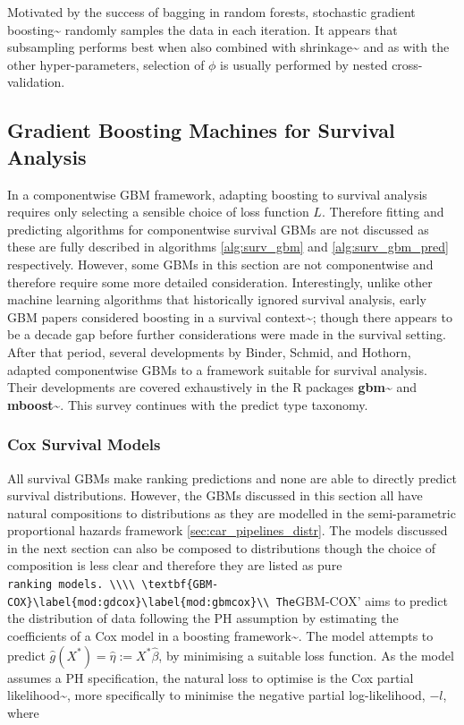 \documentclass[
  letterpaper,
]{scrbook}
\theoremstyle{plain}
\theoremstyle{definition}
\theoremstyle{remark}
\begin{document}
Motivated by the success of bagging in random forests, stochastic
gradient boosting\textasciitilde{}\cite{Friedman1999} randomly samples
the data in each iteration. It appears that subsampling performs best
when also combined with shrinkage\textasciitilde{}\cite{Hastie2001} and
as with the other hyper-parameters, selection of \(\phi\) is usually
performed by nested cross-validation.

\subsection{Gradient Boosting Machines for Survival Analysis}
\label{sec:surv_ml_models_boost_surv}

In a componentwise GBM framework, adapting boosting to survival analysis
requires only selecting a sensible choice of loss function \(L\).
Therefore fitting and predicting algorithms for componentwise survival
GBMs are not discussed as these are fully described in algorithms
\ref{alg:surv_gbm} and \ref{alg:surv_gbm_pred} respectively. However,
some GBMs in this section are not componentwise and therefore require
some more detailed consideration. Interestingly, unlike other machine
learning algorithms that historically ignored survival analysis, early
GBM papers considered boosting in a survival
context\textasciitilde{}\cite{Ridgeway1999}; though there appears to be
a decade gap before further considerations were made in the survival
setting. After that period, several developments by Binder, Schmid, and
Hothorn, adapted componentwise GBMs to a framework suitable for survival
analysis. Their developments are covered exhaustively in the R packages
\textbf{gbm}\textasciitilde{}\cite{pkggbm} and
\textbf{mboost}\textasciitilde{}\cite{pkgmboost}. This survey continues
with the predict type taxonomy.

\subsubsection{Cox Survival Models}

All survival GBMs make ranking predictions and none are able to directly
predict survival distributions. However, the GBMs discussed in this
section all have natural compositions to distributions as they are
modelled in the semi-parametric proportional hazards framework
\ref{sec:car_pipelines_distr}. The models discussed in the next section
can also be composed to distributions though the choice of composition
is less clear and therefore they are listed as pure
\texttt{ranking\textquotesingle{}\ models.\ \textbackslash{}\textbackslash{}\textbackslash{}\textbackslash{}\ \textbackslash{}textbf\{GBM-COX\}\textbackslash{}label\{mod:gdcox\}\textbackslash{}label\{mod:gbmcox\}\textbackslash{}\textbackslash{}\ The}GBM-COX'
aims to predict the distribution of data following the PH assumption by
estimating the coefficients of a Cox model in a boosting
framework\textasciitilde{}\cite{Ridgeway1999}. The model attempts to
predict \(\hat{g}(X^*) = \hat{\eta} := X^*\hat{\beta}\), by minimising a
suitable loss function. As the model assumes a PH specification, the
natural loss to optimise is the Cox partial
likelihood\textasciitilde{}\cite{Cox1972, Cox1975}, more specifically to
minimise the negative partial log-likelihood, \(-l\), where
\end{document}
